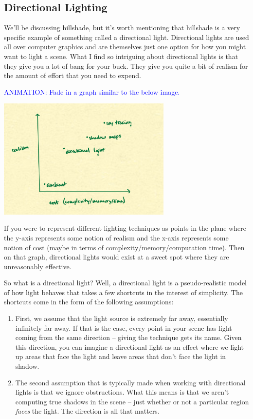 \documentclass{article}
\newcommand\animation[1]{\textcolor{blue}{ANIMATION: #1}}
\begin{document}
\subsection{Directional Lighting}

We'll be discussing hillshade, but it's worth mentioning that hillshade is a very specific example of something called a directional light.
Directional lights are used all over computer graphics and are themselves just one option for how you might want to light a scene.
What I find so intriguing about directional lights is that they give you a lot of bang for your buck.
They give you quite a bit of realism for the amount of effort that you need to expend.

\animation{Fade in a graph similar to the below image.}

\begin{center}
	\includegraphics[width=0.65\textwidth,frame]{assets/realism.jpg}
\end{center}

If you were to represent different lighting techniques as points in the plane where the y-axis represents some notion of realism and the x-axis represents some notion of cost (maybe in terms of complexity/memory/computation time).
Then on that graph, directional lights would exist at a sweet spot where they are unreasonably effective.

So what is a directional light?
Well, a directional light is a pseudo-realistic model of how light behaves that takes a few shortcuts in the interest of simplicity.
The shortcuts come in the form of the following assumptions:

\begin{enumerate}
	
\item First, we assume that the light source is extremely far away, essentially infinitely far away.
If that is the case, every point in your scene has light coming from the same direction -- giving the technique gets its name.
Given this direction, you can imagine a directional light as an effect where we light up areas that face the light and leave areas that don't face the light in shadow.

\item The second assumption that is typically made when working with directional lights is that we ignore obstructions.
What this means is that we aren't computing true shadows in the scene -- just whether or not a particular region \textit{faces} the light.
The direction is all that matters.

\end{enumerate}
\end{document}
